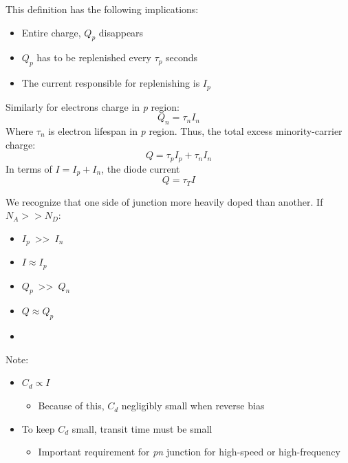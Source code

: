 \documentclass{report}
\begin{document}
This definition has the following implications:
\begin{itemize}
	\item Entire charge, $Q_p$ disappears
	\item $Q_p$ has to be replenished every $\tau_p$ seconds
	\item The current responsible for replenishing is $I_p$
\end{itemize}

Similarly for electrons charge in \textit{p} region:
\begin{equation}
	Q_n = \tau_n I_n \label{eq:3.6-qntnin}
\end{equation}
Where $\tau_n$ is electron lifespan in \textit{p} region. Thus, the total excess minority-carrier charge:
\begin{equation}
	Q = \tau_p I_p + \tau_n I_n
	\label{eq:3.6-qtpiptnin}
\end{equation}
In terms of $I = I_p + I_n$, the diode current
\begin{equation}
	Q = \tau_T I
\end{equation}

We recognize that one side of junction more heavily doped than another. If $N_A >> N_D$:
\begin{itemize}
	\item $I_p$~\textgreater{}\textgreater~$I_n$
	\item $I \approx I_p$
	\item $Q_p$~\textgreater{}\textgreater~$Q_n$
	\item $Q \approx Q_p$
	\item {}
\end{itemize}

Note:
\begin{itemize}
	\item $C_d \propto I$
		\begin{itemize}
			\item Because of this, $C_d$ negligibly small when reverse bias
		\end{itemize}
	\item To keep $C_d$ small, transit time must be small
		\begin{itemize}
			\item Important requirement for \textit{pn} junction for high-speed or high-frequency
		\end{itemize}
\end{itemize}
\end{document}
